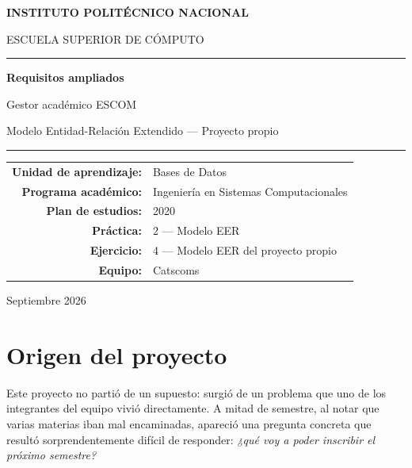 \documentclass[11pt,letterpaper]{article}
\begin{document}
\begin{titlepage}
\centering
\vspace*{2cm}

{\Large\bfseries INSTITUTO POLITÉCNICO NACIONAL\par}
\vspace{0.4cm}
{\large ESCUELA SUPERIOR DE CÓMPUTO\par}

\vspace{2.5cm}

{\color{guinda}\rule{\textwidth}{1.5pt}}
\vspace{0.6cm}

{\Huge\bfseries Requisitos ampliados\par}
\vspace{0.4cm}
{\LARGE Gestor académico ESCOM\par}
\vspace{0.3cm}
{\large Modelo Entidad-Relación Extendido --- Proyecto propio\par}

\vspace{0.6cm}
{\color{guinda}\rule{\textwidth}{1.5pt}}

\vspace{2.5cm}

\begin{tabular}{rl}
\textbf{Unidad de aprendizaje:} & Bases de Datos \\[0.3em]
\textbf{Programa académico:} & Ingeniería en Sistemas Computacionales \\[0.3em]
\textbf{Plan de estudios:} & 2020 \\[0.3em]
\textbf{Práctica:} & 2 --- Modelo EER \\[0.3em]
\textbf{Ejercicio:} & 4 --- Modelo EER del proyecto propio \\[0.3em]
\textbf{Equipo:} & Catscoms \\
\end{tabular}

\vfill
{\large Septiembre 2026\par}
\end{titlepage}

\tableofcontents
\newpage

\section{Origen del proyecto}

Este proyecto no partió de un supuesto: surgió de un problema que uno de los integrantes del equipo vivió directamente. A mitad de semestre, al notar que varias materias iban mal encaminadas, apareció una pregunta concreta que resultó sorprendentemente difícil de responder: \textit{¿qué voy a poder inscribir el próximo semestre?}
\end{document}
